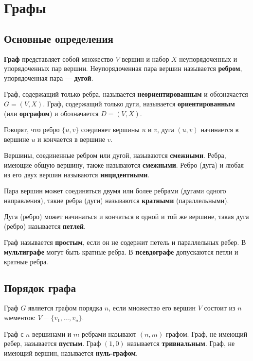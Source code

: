 \section{Графы}

\subsection{Основные определения}

\textbf{Граф} представляет собой множество \(V\) вершин и набор \(X\) неупорядоченных и упорядоченных пар вершин. Неупорядоченная пара вершин называется \textbf{ребром}, упорядоченная пара --- \textbf{дугой}.

Граф, содержащий только ребра, называется \textbf{неориентированным} и обозначается \(G = (V, X)\). Граф, содержащий только дуги, называется \textbf{ориентированным} (или \textbf{орграфом}) и обозначается \(D = (V, X)\).

Говорят, что ребро \(\{u, v\}\) соединяет вершины \(u\) и \(v\), дуга \((u, v)\) начинается в вершине \(u\) и кончается в вершине \(v\).

Вершины, соединенные ребром или дугой, называются \textbf{смежными}. Ребра, имеющие общую вершину, также называются \textbf{смежными}. Ребро (дуга) и любая из его двух вершин называются \textbf{инцидентными}.

Пара вершин может соединяться двумя или более ребрами (дугами одного направления), такие ребра (дуги) называются \textbf{кратными} (параллельными).

Дуга (ребро) может начинаться и кончаться в одной и той же вершине, такая дуга (ребро) называется \textbf{петлей}.

Граф называется \textbf{простым}, если он не содержит петель и параллельных ребер. В \textbf{мультиграфе} могут быть кратные ребра. В \textbf{псевдографе} допускаются петли и кратные ребра.

\subsection{Порядок графа}

Граф \(G\) является графом порядка \(n\), если множество его вершин \(V\) состоит из \(n\) элементов: \(V = \{v_1, \ldots, v_n\}\).

Граф с \(n\) вершинами и \(m\) ребрами называют \((n, m)\)-графом. Граф, не имеющий ребер, называется \textbf{пустым}. Граф \((1, 0)\) называется \textbf{тривиальным}. Граф, не имеющий вершин, называется \textbf{нуль-графом}.

